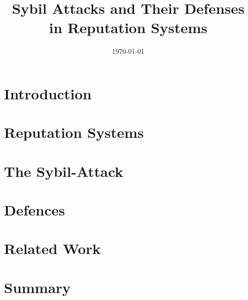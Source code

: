 \documentclass[12pt]{article}
\title{Sybil Attacks and Their Defenses in Reputation Systems}
\date{\today}
\begin{document}
\maketitle
\begin{abstract}
\end{abstract}

\section{Introduction}


\section{Reputation Systems}\label{sec:reputation}


\section{The Sybil-Attack}\label{sec:sybil}


\section{Defences}\label{sec:defences}


\section{Related Work}\label{sec:related}


\section{Summary}

\printbibliography
\end{document}
